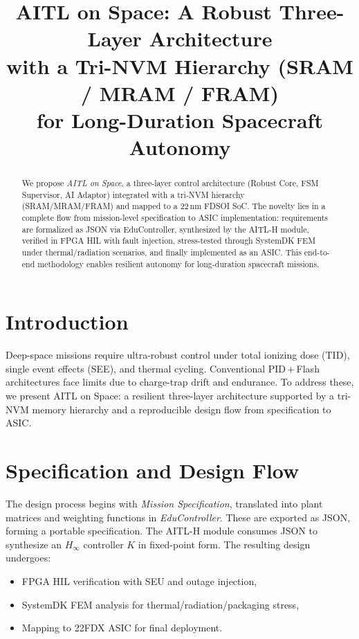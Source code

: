 \documentclass[conference]{IEEEtran}
\title{AITL on Space: A Robust Three-Layer Architecture\\
with a Tri-NVM Hierarchy (SRAM / MRAM / FRAM)\\
for Long-Duration Spacecraft Autonomy}
\author{
\IEEEauthorblockN{Shinichi Samizo}
\IEEEauthorblockA{Independent Semiconductor Researcher\\
Former Engineer at Seiko Epson Corporation\\
Email: shin3t72@gmail.com \\
GitHub: \url{https://github.com/Samizo-AITL}}
}
\begin{document}
\maketitle

\begin{abstract}
We propose \emph{AITL on Space}, a three-layer control architecture (Robust Core, FSM Supervisor, AI Adaptor) integrated with a tri-NVM hierarchy (SRAM/MRAM/FRAM) and mapped to a 22\,nm FD\!SOI SoC. The novelty lies in a complete flow from mission-level specification to ASIC implementation: requirements are formalized as JSON via EduController, synthesized by the AITL-H module, verified in FPGA HIL with fault injection, stress-tested through SystemDK FEM under thermal/radiation scenarios, and finally implemented as an ASIC. This end-to-end methodology enables resilient autonomy for long-duration spacecraft missions.
\end{abstract}

\section{Introduction}
Deep-space missions require ultra-robust control under total ionizing dose (TID), single event effects (SEE), and thermal cycling. Conventional PID\,+\,Flash architectures face limits due to charge-trap drift and endurance. To address these, we present AITL on Space: a resilient three-layer architecture supported by a tri-NVM memory hierarchy and a reproducible design flow from specification to ASIC.

\section{Specification and Design Flow}
The design process begins with \emph{Mission Specification}, translated into plant matrices and weighting functions in \emph{EduController}. These are exported as JSON, forming a portable specification. The AITL-H module consumes JSON to synthesize an $H_\infty$ controller $K$ in fixed-point form. The resulting design undergoes:
\begin{itemize}
  \item FPGA HIL verification with SEU and outage injection,
  \item SystemDK FEM analysis for thermal/radiation/packaging stress,
  \item Mapping to 22FDX ASIC for final deployment.
\end{itemize}
\end{document}
